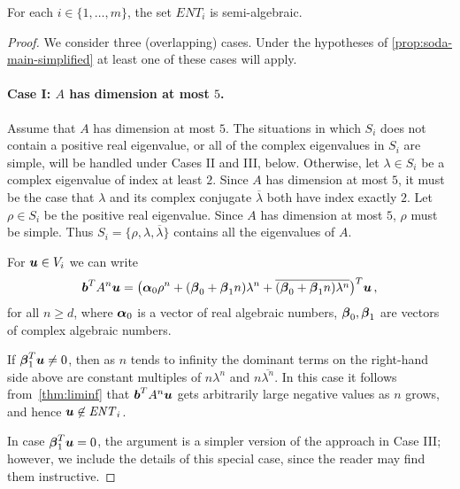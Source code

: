 \begin{proposition}
For each $i \in \lbrace 1, \ldots, m \rbrace$, the set $\mathit{ENT}_i$ is semi-algebraic.
\label{prop:semi-alg}
\end{proposition}
\begin{proof}
  We consider three (overlapping) cases.  Under the hypotheses of
  \cref{prop:soda-main-simplified} at least one of these cases will apply.

\paragraph{Case I: $A$ has dimension at most $5$.}
Assume that $A$ has dimension at most $5$.  The situations in which
$S_i$ does not contain a positive real eigenvalue, or
all of the complex eigenvalues in $S_i$ are simple, will be handled
under Cases II and III, below.  Otherwise, let $\lambda\in S_i$ be a complex
eigenvalue of index at least $2$.  Since $A$ has dimension at most
$5$, it must be the case that $\lambda$ and its complex conjugate
$\overline{\lambda}$ both have index exactly $2$.  Let $\rho \in S_i$
be the positive real eigenvalue.  Since
$A$ has dimension at most $5$, $\rho$ must be simple.  Thus
$S_i=\lbrace \rho,\lambda,\overline{\lambda}\rbrace$ contains all the eigenvalues
of $A$.

For $\boldsymbol{u}\in V_i$ we can write
\begin{align*}
\myvector{b}^TA^n\myvector{u} =
\big(\myvector{\alpha}_0\rho^n  + (\myvector{\beta}_0+ \myvector{\beta}_1n)\lambda^n
 + \overline{(\myvector{\beta}_0+\myvector{\beta}_1n)
\lambda^n}\big)^T\myvector{u} \, ,
\label{eq:small}
\end{align*}
for all $n\geq d$,
where $\boldsymbol{\alpha}_0$ is a vector of real algebraic numbers,
$\boldsymbol{\beta}_0,\boldsymbol{\beta}_1$ are vectors of complex
algebraic numbers.

If $\boldsymbol{\beta}_1^T\boldsymbol{u}\neq 0$, then as $n$ tends to
infinity the dominant terms on the right-hand side above are constant
multiples of $n\lambda^n$ and $n\overline{\lambda^n}$.  In this case
it follows from~\cref{thm:liminf} that
$\boldsymbol{b}^{T} A^{n}\boldsymbol{u}$ gets arbitrarily large negative values as
$n$ grows, and hence $\boldsymbol{u}\not\in\mathit{ENT}_i$.

In case $\boldsymbol{\beta}_1^T\boldsymbol{u}=0$, the argument is a
simpler version of the approach in Case III; however, we include the
details of this special case, since the reader may find them instructive.


\end{proof}
